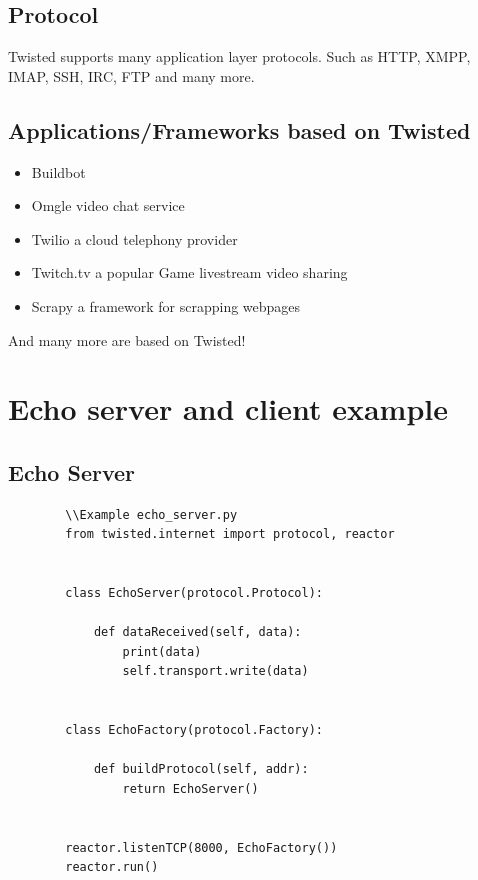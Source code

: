 \documentclass{article}
\begin{document}
    \subsection{Protocol}
      Twisted supports many application layer protocols. Such as HTTP, XMPP,
      IMAP, SSH, IRC, FTP and many more.

    \subsection{Applications/Frameworks based on Twisted}

    \begin{itemize}
      \item Buildbot \cite{buildbot}
      \item Omgle video chat service \cite{omegle}
      \item Twilio a cloud telephony provider \cite{twilio}
      \item Twitch.tv a popular Game livestream video sharing \cite{twitch}
      \item Scrapy a framework for scrapping webpages \cite{SCrapy}
    \end{itemize}

    And many more are based on Twisted!

  \section{Echo server and client example}

    \subsection{Echo Server}
      \begin{verbatim}
        \\Example echo_server.py
        from twisted.internet import protocol, reactor


        class EchoServer(protocol.Protocol):

            def dataReceived(self, data):
                print(data)
                self.transport.write(data)


        class EchoFactory(protocol.Factory):

            def buildProtocol(self, addr):
                return EchoServer()


        reactor.listenTCP(8000, EchoFactory())
        reactor.run()
      \end{verbatim}
\end{document}
